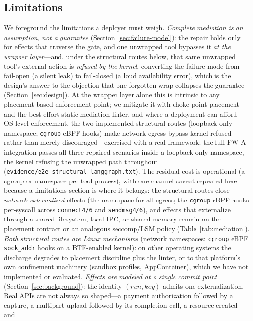 \documentclass[10pt,journal,compsoc]{IEEEtran}
\begin{document}
\subsection{Limitations}
\label{sec:limitations}
We foreground the limitations a deployer must weigh.
\emph{Complete mediation is an assumption, not a guarantee}
(Section~\ref{sec:failure-model}): the repair holds only for effects that
traverse the gate, and one unwrapped tool bypasses it \emph{at the wrapper
layer}---and, under the structural routes below, that same unwrapped tool's
external action is \emph{refused by the kernel}, converting the failure mode
from fail-open (a silent leak) to fail-closed (a loud availability error),
which is the design's answer to the objection that one forgotten wrap
collapses the guarantee (Section~\ref{sec:design}). At the wrapper layer alone this is intrinsic to any placement-based enforcement point; we mitigate it with choke-point placement and the best-effort static mediation linter, and where a deployment can afford OS-level enforcement, the two implemented structural routes (loopback-only namespace; \texttt{cgroup} eBPF hooks) make network-egress bypass kernel-refused rather than merely discouraged---exercised with a real framework: the full \textsf{FW-A} integration passes all three repaired scenarios inside a loopback-only namespace, the kernel refusing the unwrapped path throughout (\texttt{evidence/e2e\_structural\_langgraph.txt}). The residual cost is operational (a cgroup or namespace per tool process), with one channel caveat repeated here because a limitations section is where it belongs: the structural routes close \emph{network-externalized}
effects (the namespace for all egress; the \texttt{cgroup} eBPF hooks
per-syscall across \texttt{connect4/6} and \texttt{sendmsg4/6}), and effects that
externalize through a shared filesystem, local IPC, or shared memory remain
on the placement contract or an analogous seccomp/LSM policy
(Table~\ref{tab:mediation}). \emph{Both structural routes are Linux
mechanisms} (network namespaces; \texttt{cgroup} eBPF \texttt{sock\_addr}
hooks on a BTF-enabled kernel): on other operating systems the discharge
degrades to placement discipline plus the linter, or to that platform's own
confinement machinery (sandbox profiles, AppContainer), which we have not
implemented or evaluated. \emph{Effects are modeled at a single commit
point} (Section~\ref{sec:background}): the identity
$(\mathit{run},\mathit{key})$ admits one externalization. Real APIs are not
always so shaped---a payment authorization followed by a capture, a
multipart upload followed by its completion call, a resource created and
\end{document}
